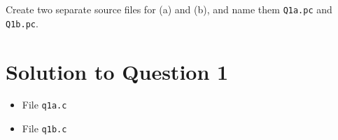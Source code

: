 Create two separate source files for (a) and (b), and name them \texttt{Q1a.pc} and \texttt{Q1b.pc}.

\section*{Solution to Question 1}

\lstset{language=c}
\lstset{tabsize=4}

\begin{itemize}

\item[] File \texttt{q1a.c}


\item[] File \texttt{q1b.c}


\end{itemize}

